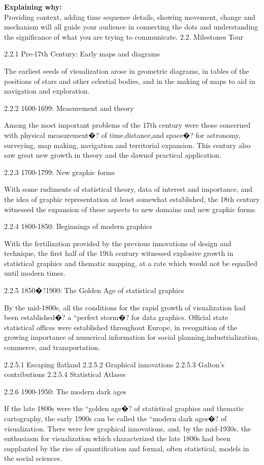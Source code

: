 \documentclass[]{book}
\theoremstyle{definition}
\theoremstyle{definition}
\theoremstyle{definition}
\theoremstyle{remark}
\begin{document}
\textbf{Explaining why:}\\
Providing context, adding time sequence details, showing movement,
change and mechanism will all guide your audience in connecting the dots
and understanding the significance of what you are trying to
communicate. 2.2. Milestones Tour

2.2.1 Pre-17th Century: Early maps and diagrams

The earliest seeds of visualization arose in geometric diagrams, in
tables of the positions of stars and other celestial bodies, and in the
making of maps to aid in navigation and exploration.

2.2.2 1600-1699: Measurement and theory

Among the most important problems of the 17th century were those
concerned with physical measurement�? of time,distance,and space�? for
astronomy, surveying, map making, navigation and territorial expansion.
This century also saw great new growth in theory and the dawnof
practical application.

2.2.3 1700-1799: New graphic forms

With some rudiments of statistical theory, data of interest and
importance, and the idea of graphic representation at least somewhat
established, the 18th century witnessed the expansion of these aspects
to new domains and new graphic forms.

2.2.4 1800-1850: Beginnings of modern graphics

With the fertilization provided by the previous innovations of design
and technique, the first half of the 19th century witnessed explosive
growth in statistical graphics and thematic mapping, at a rate which
would not be equalled until modern times.

2.2.5 1850�?1900: The Golden Age of statistical graphics

By the mid-1800s, all the conditions for the rapid growth of
visualization had been established�? a ``perfect storm�? for data
graphics. Official state statistical offices were established throughout
Europe, in recognition of the growing importance of numerical
information for social planning,industrialization, commerce, and
transportation.

2.2.5.1 Escaping flatland 2.2.5.2 Graphical innovations 2.2.5.3 Galton's
contributions 2.2.5.4 Statistical Atlases

2.2.6 1900-1950: The modern dark ages

If the late 1800s were the ``golden age�? of statistical graphics and
thematic cartography, the early 1900s can be called the ``modern dark
ages�? of visualization. There were few graphical innovations, and, by
the mid-1930s, the enthusiasm for visualization which characterized the
late 1800s had been supplanted by the rise of quantification and formal,
often statistical, models in the social sciences.
\end{document}
